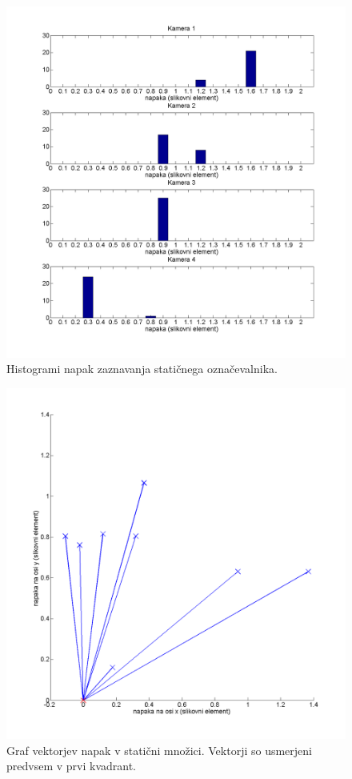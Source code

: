 \documentclass[a4paper, 12pt]{book}
\begin{document}
\begin{figure}
\centering
\includegraphics[width=\textwidth,height=\textheight,keepaspectratio]{marker_detection_static_bar.png}
\caption{Histogrami napak zaznavanja statičnega označevalnika.}
\label{marker_detection_static_bar}
\end{figure}

\begin{figure}
\centering
\includegraphics[width=\textwidth,height=\textheight,keepaspectratio]{marker_detection_static_errors.png}
\caption{Graf vektorjev napak v statični množici. Vektorji so usmerjeni predvsem v prvi kvadrant.}
\label{marker_detection_static_errors}
\end{figure}
\end{document}
